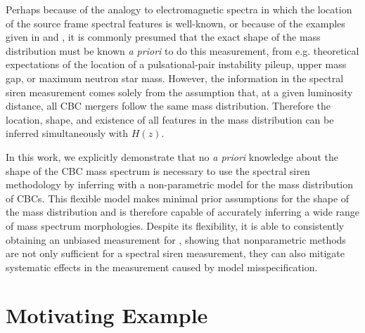 \documentclass[]{aastex631}
\begin{document}
Perhaps because of the analogy to electromagnetic spectra in which the location of the source frame spectral features is well-known, or because of the examples given in \cite{farr_future_2019} and \cite{chernoff+fin}, it is commonly presumed that the exact shape of the mass distribution must be known \emph{a priori} to do this measurement, from e.g. theoretical expectations of the location of a pulsational-pair instability pileup, upper mass gap, or maximum neutron star mass.
However, the information in the spectral siren measurement comes solely from the assumption that, at a given luminosity distance, all CBC mergers follow the same mass distribution.
Therefore the location, shape, and existence of all features in the mass distribution can be inferred simultaneously with $H(z)$.

In this work, we explicitly demonstrate that no \emph{a priori} knowledge about the shape of the CBC mass spectrum is necessary to use the spectral siren methodology by inferring \Ho with a non-parametric model for the mass distribution of CBCs. 
This flexible model makes minimal prior assumptions for the shape of the mass distribution and is therefore capable of accurately inferring a wide range of mass spectrum morphologies.
Despite its flexibility, it is able to consistently obtaining an unbiased measurement for \Ho, showing that nonparametric methods are not only sufficient for a spectral siren measurement, they can also mitigate systematic effects in the measurement caused by model misspecification.

\section{Motivating Example}
\end{document}
